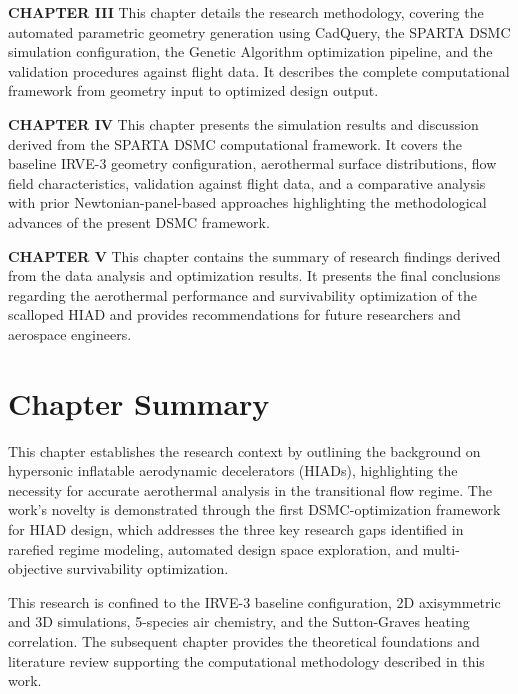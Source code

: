 \textbf{CHAPTER III} This chapter details the research methodology, covering the automated parametric geometry generation using CadQuery, the SPARTA DSMC simulation configuration, the Genetic Algorithm optimization pipeline, and the validation procedures against flight data. It describes the complete computational framework from geometry input to optimized design output.

\textbf{CHAPTER IV} This chapter presents the simulation results and discussion derived from the SPARTA DSMC computational framework. It covers the baseline IRVE-3 geometry configuration, aerothermal surface distributions, flow field characteristics, validation against flight data, and a comparative analysis with prior Newtonian-panel-based approaches highlighting the methodological advances of the present DSMC framework.

\textbf{CHAPTER V} This chapter contains the summary of research findings derived from the data analysis and optimization results. It presents the final conclusions regarding the aerothermal performance and survivability optimization of the scalloped HIAD and provides recommendations for future researchers and aerospace engineers.

\section*{Chapter Summary}
This chapter establishes the research context by outlining the background on hypersonic inflatable aerodynamic decelerators (HIADs), highlighting the necessity for accurate aerothermal analysis in the transitional flow regime. The work's novelty is demonstrated through the first DSMC-optimization framework for HIAD design, which addresses the three key research gaps identified in rarefied regime modeling, automated design space exploration, and multi-objective survivability optimization.

This research is confined to the IRVE-3 baseline configuration, 2D axisymmetric and 3D simulations, 5-species air chemistry, and the Sutton-Graves heating correlation. The subsequent chapter provides the theoretical foundations and literature review supporting the computational methodology described in this work.
